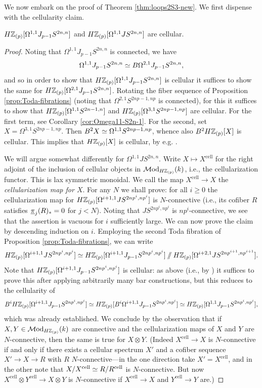 \documentclass{amsart}
\renewcommand{\NB}[1]{}
\numberwithin{proposition}{section}
\numberwithin{equation}{section}
\def\cell{\mathrm{cell}}
\begin{document}
We now embark on the proof of Theorem \ref{thm:loops2S3-new}.
We first dispense with the cellularity claim.
\begin{lemma} \label{lemm:loops2S3-cellular}
$H\mathbb{Z}_{(p)}[\Omega^{1,1}J_{p-1}S^{2n,n}]$ and $H\mathbb{Z}_{(p)}[\Omega^{1,1}JS^{2n,n}]$ are cellular.
\end{lemma}
\begin{proof}\NB{perhaps more details?}
Noting that $\Omega^{1,1}J_{p-1}S^{2n,n}$ is connected, we have \[ \Omega^{1,1}J_{p-1}S^{2n,n} \simeq B \Omega^{2,1} J_{p-1} S^{2n,n}, \] and so in order to show that $H\mathbb{Z}_{(p)}[\Omega^{1,1}J_{p-1}S^{2n,n}]$ is cellular it suffices to show the same for $H\mathbb{Z}_{(p)}[\Omega^{2,1}J_{p-1}S^{2n,n}]$.
Rotating the fiber sequence of Proposition \ref{prop:Toda-fibrations} (noting that $\Omega^{2,1} S^{2np-1,np}$ is connected), for this it suffices to show that $H\mathbb{Z}_{(p)}[\Omega^{1,1}S^{2n-1,n}]$ and $H\mathbb{Z}_{(p)}[\Omega^{3,1}S^{2np-1,np}]$ are cellular.
For the first term, see Corollary \ref{cor:Omega11-S2n-1}.
For the second, set $X = \Omega^{3,1}S^{2np-1,np}$.
Then $B^2 X \simeq \Omega^{1,1}S^{2np-1,np}$, whence also $B^2 H\mathbb{Z}_{(p)}[X]$ is cellular.
This implies that $H\mathbb{Z}_{(p)}[X]$ is cellular, by e.g. \cite[Lemma 5.9]{bachmann-wilson}.

We will argue somewhat differently for $\Omega^{1,1}JS^{2n,n}$.
Write $X \mapsto X^\cell$ for the right adjoint of the inclusion of cellular objects in $\mathcal{M}\mathrm{od}_{H\mathbb{Z}_{(p)}}(k)$, i.e., the cellularization functor.
This is lax symmetric monoidal.
We call the map $X^\cell \to X$ the \emph{cellularization map for $X$}.
For any $N$ we shall prove: for all $i \ge 0$ the cellularization map for $H\mathbb{Z}_{(p)}[\Omega^{i+1,1} J S^{2np^i,np^i}]$ is $N$-connective (i.e., its cofiber $R$ satisfies $\underline\pi_j(R)_* = 0$ for $j < N$).
Noting that $JS^{2np^i,np^i}$ is $np^i$-connective, we see that the assertion is vacuous for $i$ sufficiently large.
We can now prove the claim by descending induction on $i$.
Employing the second Toda fibration of Proposition \ref{prop:Toda-fibrations}, we can write \[ H\mathbb{Z}_{(p)}[\Omega^{i+1,1}JS^{2np^i,np^i}] \simeq H\mathbb{Z}_{(p)}[\Omega^{i+1,1}J_{p-1}S^{2np^i,np^i}] \sslash H\mathbb{Z}_{(p)}[\Omega^{i+2,1} JS^{2np^{i+1},np^{i+1}}]. \]
Note that $H\mathbb{Z}_{(p)}[\Omega^{i+1,1}J_{p-1}S^{2np^i,np^i}]$ is cellular: as above (i.e., by \cite[Lemma 5.9]{bachmann-wilson}) it suffices to prove this after applying arbitrarily many bar constructions, but this reduces to the cellularity of \[ B^i H\mathbb{Z}_{(p)}[\Omega^{i+1,1}J_{p-1}S^{2np^i,np^i}] \simeq H\mathbb{Z}_{(p)}[B^i \Omega^{i+1,1}J_{p-1}S^{2np^i,np^i}] \simeq H\mathbb{Z}_{(p)}[\Omega^{1,1}J_{p-1}S^{2np^i,np^i}], \] which was already established.
We conclude by the observation that if $X, Y \in \mathcal{M}\mathrm{od}_{H\mathbb{Z}_{(p)}}(k)$ are connective and the cellularization maps of $X$ and $Y$ are $N$-connective, then the same is true for $X \otimes Y$.
(Indeed $X^\cell \to X$ is $N$-connective if and only if there exists a cellular spectrum $X'$ and a cofiber sequence $X' \to X \to R$ with $R$ $N$-connective---in the one direction take $X'=X^\cell$, and in the other note that $X/X^\cell \wequi R/R^\cell$ is $N$-connective.
But now $X^\cell \otimes Y^\cell \to X \otimes Y$ is $N$-connective if $X^\cell \to X$ and $Y^\cell \to Y$ are.)
\end{proof}
\end{document}
